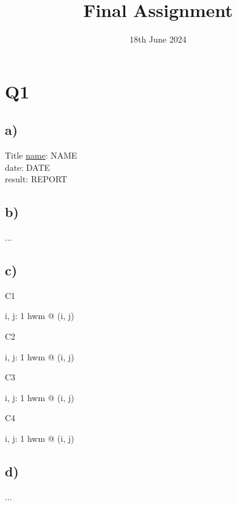 \documentclass{article}
\title{Final Assignment}
\date{\vspace{-1.0cm}18th June 2024}
\begin{document}
\maketitle

\section*{Q1}

\subsection*{\small a)}

\begin{schema}{Title}
	\underline{name}: NAME \\
	date: DATE \\
	result: REPORT
\end{schema}

\subsection*{\small b)}
...

\subsection*{\small c)}

C1

\begin{zed}
\forall i, j: 1 \upto hwm @ (i, j)
\end{zed}

\hspace{-0.6cm} 
C2

\begin{zed}
\forall i, j: 1 \upto hwm @ (i, j)
\end{zed}

\hspace{-0.6cm} 
C3

\begin{zed}
\forall i, j: 1 \upto hwm @ (i, j)
\end{zed}

\hspace{-0.6cm} 
C4

\begin{zed}
\forall i, j: 1 \upto hwm @ (i, j)
\end{zed}


\subsection*{\small d)}
...
\end{document}

